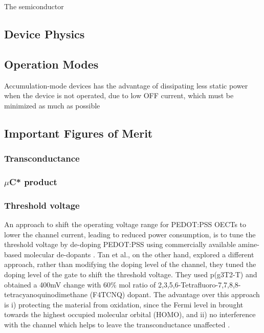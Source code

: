 The semiconductor


\subsection{Device Physics}

\subsection{Operation Modes}

Accumulation-mode devices has the advantage of dissipating less static power when the device is not operated, due to low OFF current, which must be minimized as much as possible \cite{giovannittiEnergeticControlRedoxActive2020}

\subsection{Important Figures of Merit}
\subsubsection{Transconductance}
\subsubsection{$\mu$C* product}
\subsubsection{Threshold voltage}

An approach to shift the operating voltage range for PEDOT:PSS OECTs to lower the channel current, leading to reduced power consumption, is to tune the threshold voltage by de-doping PEDOT:PSS using commercially available amine-based molecular de-dopants \cite{Keene_enhmod_pedot}. Tan et al., on the other hand, explored a different approach, rather than modifying the doping level of the channel, they tuned the doping level of the gate to shift the threshold voltage. They used p(g3T2-T) and obtained a 400mV change with 60\% mol ratio of 2,3,5,6-Tetrafluoro-7,7,8,8-tetracyanoquinodimethane (F4TCNQ) dopant. The advantage over this approach is i) protecting the material from oxidation, since the Fermi level in brought towards the highest occupied molecular orbital (HOMO), and ii) no interference with the channel which helps to leave the transconductance unaffected \cite{tanTuningOrganicElectrochemical2022}.


